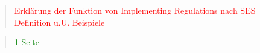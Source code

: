 \begin{quote}
\textcolor{red}{Erklärung der Funktion von Implementing Regulations nach SES Definition u.U. Beispiele}
\end{quote}
\begin{quote}
\textcolor{green}{1 Seite}
\end{quote}

